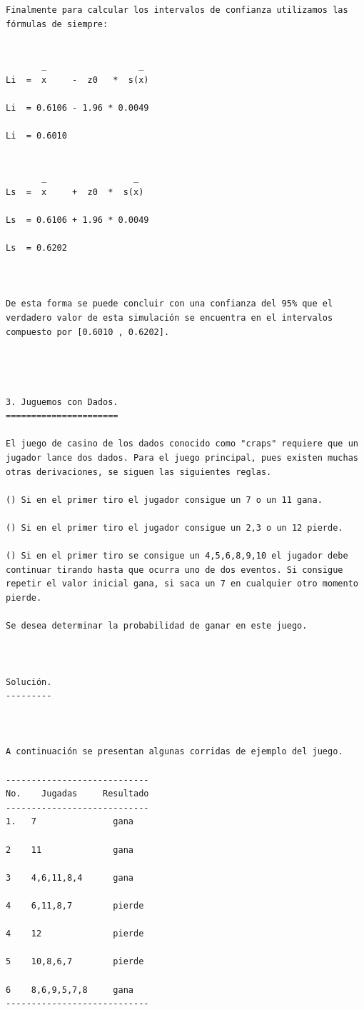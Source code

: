 \begin{verbatim}
Finalmente para calcular los intervalos de confianza utilizamos las fórmulas de siempre:


       _                  _
Li  =  x     -  z0   *  s(x)

Li  = 0.6106 - 1.96 * 0.0049

Li  = 0.6010


       _                 _
Ls  =  x     +  z0  *  s(x)
                        
Ls  = 0.6106 + 1.96 * 0.0049

Ls  = 0.6202



De esta forma se puede concluir con una confianza del 95% que el verdadero valor de esta simulación se encuentra en el intervalos compuesto por [0.6010 , 0.6202].




3. Juguemos con Dados.
======================

El juego de casino de los dados conocido como "craps" requiere que un jugador lance dos dados. Para el juego principal, pues existen muchas otras derivaciones, se siguen las siguientes reglas.

() Si en el primer tiro el jugador consigue un 7 o un 11 gana.

() Si en el primer tiro el jugador consigue un 2,3 o un 12 pierde.

() Si en el primer tiro se consigue un 4,5,6,8,9,10 el jugador debe continuar tirando hasta que ocurra uno de dos eventos. Si consigue repetir el valor inicial gana, si saca un 7 en cualquier otro momento pierde.

Se desea determinar la probabilidad de ganar en este juego.



Solución.
---------



A continuación se presentan algunas corridas de ejemplo del juego.

----------------------------
No.    Jugadas     Resultado
----------------------------
1.   7               gana

2    11              gana

3    4,6,11,8,4      gana

4    6,11,8,7        pierde

4    12              pierde

5    10,8,6,7        pierde

6    8,6,9,5,7,8     gana
----------------------------



\end{verbatim}
